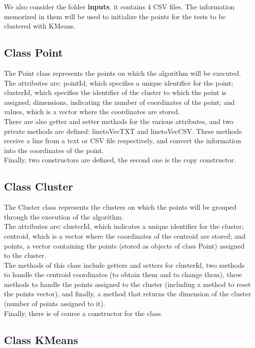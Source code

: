 \documentclass[10pt,twocolumn,letterpaper]{article}
\begin{document}
We also consider the folder \textbf{inputs}, it contains 4 CSV files. The information memorized in them will be used to initialize the points for the tests to be clustered with KMeans.

\subsection{Class Point}
The Point class represents the points on which the algorithm will be executed.\\
The attributes are: pointId, which specifies a unique identifier for the point; clusterId, which specifies the identifier of the cluster to which the point is assigned; dimensions, indicating the number of coordinates of the point; and values, which is a vector where the coordinates are stored.\\
There are also getter and setter methods for the various attributes, and two private methods are defined: linetoVecTXT and linetoVecCSV. These methods receive a line from a text or CSV file respectively, and convert the information into the coordinates of the point.\\
Finally, two constructors are defined, the second one is the copy constructor.

\subsection{Class Cluster}
The Cluster class represents the clusters on which the points will be grouped through the execution of the algorithm.\\
The attributes are: clusterId, which indicates a unique identifier for the cluster; centroid, which is a vector where the coordinates of the centroid are stored; and points, a vector containing the points (stored as objects of class Point) assigned to the cluster.\\
The methods of this class include getters and setters for clusterId, two methods to handle the centroid coordinates (to obtain them and to change them), three methods to handle the points assigned to the cluster (including a method to reset the points vector), and finally, a method that returns the dimension of the cluster (number of points assigned to it).\\
Finally, there is of course a constructor for the class.

\subsection{Class KMeans}
\end{document}
